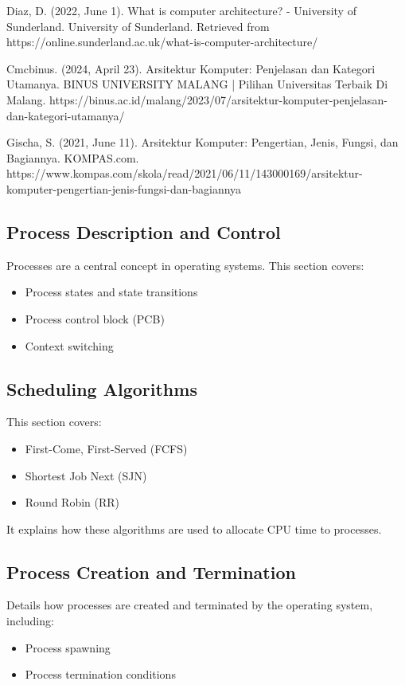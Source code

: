 \documentclass[12pt]{article}
\begin{document}
\begin{thebibliography}{9}

    \bibitem{} Diaz, D. (2022, June 1). What is computer architecture? - University of Sunderland. University of Sunderland. Retrieved from https://online.sunderland.ac.uk/what-is-computer-architecture/
    
    \bibitem{} Cmcbinus. (2024, April 23). Arsitektur Komputer: Penjelasan dan Kategori Utamanya. BINUS UNIVERSITY MALANG | Pilihan Universitas Terbaik Di Malang. https://binus.ac.id/malang/2023/07/arsitektur-komputer-penjelasan-dan-kategori-utamanya/
    
    \bibitem{} Gischa, S. (2021, June 11). Arsitektur Komputer: Pengertian, Jenis, Fungsi, dan Bagiannya. KOMPAS.com. https://www.kompas.com/skola/read/2021/06/11/143000169/arsitektur-komputer-pengertian-jenis-fungsi-dan-bagiannya
    
\end{thebibliography}

\subsection{Process Description and Control}
Processes are a central concept in operating systems. This section covers:
\begin{itemize}
    \item Process states and state transitions
    \item Process control block (PCB)
    \item Context switching
\end{itemize}

\subsection{Scheduling Algorithms}
This section covers:
\begin{itemize}
    \item First-Come, First-Served (FCFS)
    \item Shortest Job Next (SJN)
    \item Round Robin (RR)
\end{itemize}
It explains how these algorithms are used to allocate CPU time to processes.

\subsection{Process Creation and Termination}
Details how processes are created and terminated by the operating system, including:
\begin{itemize}
    \item Process spawning
    \item Process termination conditions
\end{itemize}
\end{document}
